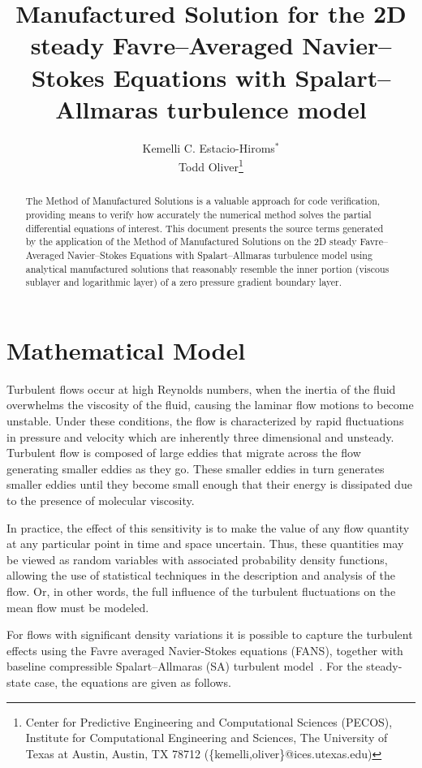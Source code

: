 \documentclass[10pt]{article}
\title{Manufactured Solution for the 2D steady Favre--Averaged Navier--Stokes Equations with Spalart--Allmaras turbulence model}
\author{Kemelli C. Estacio-Hiroms$^*$ \\ Todd Oliver\thanks{Center for Predictive Engineering and Computational Sciences (PECOS), Institute for Computational
    Engineering and Sciences, The University of Texas at Austin,
    Austin, TX 78712 (\{kemelli,oliver\}@ices.utexas.edu)}}
\begin{document}
\maketitle
\tableofcontents

\begin{abstract}
The Method of Manufactured Solutions is a valuable approach for code verification, providing means to verify how accurately the numerical method solves the partial differential equations of interest.
This document presents the source terms generated by the application of the Method of Manufactured Solutions on the 2D steady Favre--Averaged Navier--Stokes Equations with Spalart--Allmaras turbulence model using analytical manufactured solutions that  reasonably resemble the inner portion (viscous sublayer and logarithmic layer) of a zero pressure gradient boundary layer.
\end{abstract}




\section{Mathematical Model}

Turbulent flows occur at high Reynolds numbers, when the inertia of the fluid overwhelms the viscosity of the fluid, causing the laminar flow motions to become unstable. Under these conditions, the flow is characterized by rapid fluctuations in pressure and velocity which are inherently three dimensional and unsteady. Turbulent flow is composed of large eddies that migrate across the flow generating smaller eddies as they go. These smaller eddies in turn generates smaller eddies until they become small enough that their energy is dissipated due to the presence of molecular viscosity.

In practice, the effect of this sensitivity
is to make the value of any flow quantity at any particular point in
time and space uncertain.  Thus, these quantities may be viewed as
random variables with associated probability density functions,
allowing the use of statistical techniques in the description and
analysis of the flow. Or, in other words, the full influence of the turbulent fluctuations on the mean flow must be modeled.

For flows with significant density variations it is possible to  capture the turbulent effects using the Favre averaged Navier-Stokes equations (FANS), together with baseline compressible Spalart--Allmaras (SA) turbulent model~\citep{Oliver2010,Spalart_1994_One_Eqn_Turb_Model}. For the steady-state case, the equations are given as follows.
\end{document}

